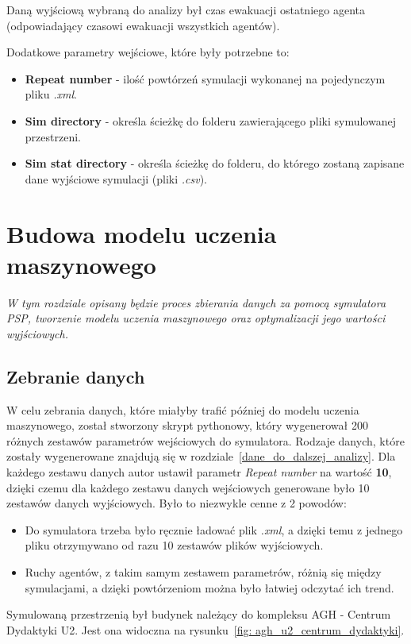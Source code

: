 \documentclass[12pt]{aghdpl}
\begin{document}
		Daną wyjściową wybraną do analizy był czas ewakuacji ostatniego agenta (odpowiadający czasowi ewakuacji wszystkich agentów).
		
		Dodatkowe parametry wejściowe, które były potrzebne to:
		\begin{itemize}
		\item \textbf{Repeat number} - ilość powtórzeń symulacji wykonanej na pojedynczym pliku \textit{.xml}.
		\item \textbf{Sim directory} - określa ścieżkę do folderu zawierającego pliki symulowanej przestrzeni.
		\item \textbf{Sim stat directory} - określa ścieżkę do folderu, do którego zostaną zapisane dane wyjściowe symulacji (pliki \textit{.csv}).
		\end{itemize}
		
	\chapter{Budowa modelu uczenia maszynowego}
	\textit{W tym rozdziale opisany będzie proces zbierania danych za pomocą symulatora PSP, tworzenie modelu uczenia maszynowego oraz optymalizacji jego wartości wyjściowych.}
	
		\section{Zebranie danych} \label{zebranie_danych}
		W celu zebrania danych, które miałyby trafić później do modelu uczenia maszynowego, został stworzony skrypt pythonowy, który wygenerował 200 różnych zestawów parametrów wejściowych do symulatora. Rodzaje danych, które zostały wygenerowane znajdują się w rozdziale~\ref{dane_do_dalszej_analizy}. Dla każdego zestawu danych autor ustawił parametr \textit{Repeat number} na wartość \textbf{10}, dzięki czemu dla każdego zestawu danych wejściowych generowane było 10 zestawów danych wyjściowych. Było to niezwykle cenne z 2 powodów:
		\begin{itemize}
		\item Do symulatora trzeba było ręcznie ładować plik \textit{.xml}, a dzięki temu z jednego pliku otrzymywano od razu 10 zestawów plików wyjściowych.
		\item Ruchy agentów, z takim samym zestawem parametrów, różnią się między symulacjami, a dzięki powtórzeniom można było łatwiej odczytać ich trend.
		\end{itemize}
		
		Symulowaną przestrzenią był budynek należący do kompleksu AGH - Centrum Dydaktyki U2. Jest ona widoczna na rysunku~\ref{fig: agh_u2_centrum_dydaktyki}.
		
\end{document}
